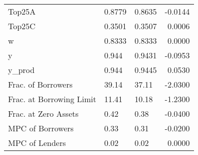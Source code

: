 \begin{table}
\begin{tabular}{lllr}
                  Top25A &  0.8779 &   0.8635 &  -0.0144 \\
                  Top25C &  0.3501 &   0.3507 &   0.0006 \\
                       w &  0.8333 &   0.8333 &   0.0000 \\
                       y &   0.944 &   0.9431 &  -0.0953 \\
                  y\_prod &   0.944 &   0.9445 &   0.0530 \\
      Frac. of Borrowers &   39.14 &    37.11 &  -2.0300 \\
Frac. at Borrowing Limit &   11.41 &    10.18 &  -1.2300 \\
    Frac. at Zero Assets &    0.42 &     0.38 &  -0.0400 \\
        MPC of Borrowers &    0.33 &     0.31 &  -0.0200 \\
          MPC of Lenders &    0.02 &     0.02 &   0.0000 \\
\bottomrule
\end{tabular}
\end{table}
